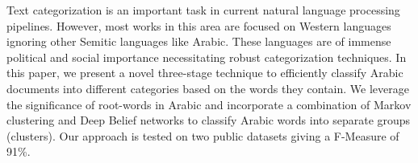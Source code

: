Text categorization is an important task in current natural language processing pipelines. However, most works in this area are focused on Western languages ignoring other Semitic languages like Arabic. These languages are of immense political and social importance necessitating robust categorization techniques. In this paper, we present a novel three-stage technique to efficiently classify Arabic documents into different categories based on the words they contain. We leverage the significance of root-words in Arabic and incorporate a combination of Markov clustering and Deep Belief networks to classify Arabic words into separate groups (clusters). Our approach is tested on two public datasets giving a F-Measure of 91\%.
